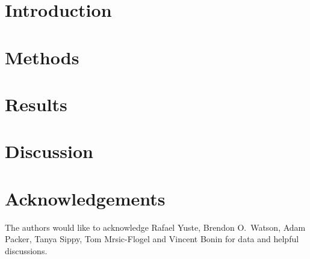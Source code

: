 \documentclass[aoas,preprint]{imsart}
\begin{document}
\section{Introduction}
\label{intro}


\section{Methods}
\label{sec:methods}



\section{Results}
\label{sec:results}


\section{Discussion}
\label{sec:discussion}


\section*{Acknowledgements}
The authors would like to acknowledge Rafael Yuste, Brendon O.\ Watson, Adam Packer, Tanya Sippy, Tom Mrsic-Flogel and Vincent Bonin for data and helpful discussions.


% 

\end{document}
